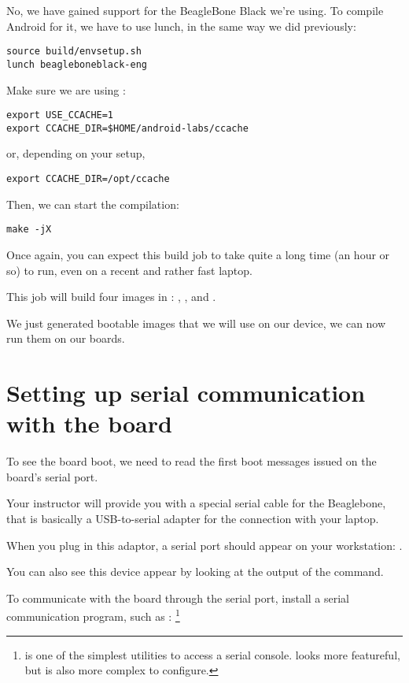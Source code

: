 No, we have gained support for the BeagleBone Black we're using. To
compile Android for it, we have to use lunch, in the same way we did
previously:

\begin{verbatim}
source build/envsetup.sh
lunch beagleboneblack-eng
\end{verbatim}

Make sure we are using :

\begin{verbatim}
export USE_CCACHE=1
export CCACHE_DIR=$HOME/android-labs/ccache
\end{verbatim}
or, depending on your setup,
\begin{verbatim}
export CCACHE_DIR=/opt/ccache
\end{verbatim}

Then, we can start the compilation:

\begin{verbatim}
make -jX
\end{verbatim}

Once again, you can expect this build job to take quite a long time
(an hour or so) to run, even on a recent and rather fast laptop.

This job will build four images in
: ,
 ,  and
.

We just generated bootable images that we will use on our device, we
can now run them on our boards.

\section{Setting up serial communication with the board}

To see the board boot, we need to read the first boot messages issued
on the board's serial port.

Your instructor will provide you with a special serial cable for the
Beaglebone, that is basically a USB-to-serial adapter for the
connection with your laptop.

When you plug in this adaptor, a serial port should appear on your
workstation: .

You can also see this device appear by looking at the output of the
 command.

To communicate with the board through the serial port, install a
serial communication program, such as :
\footnote{ is one of the simplest utilities to access a
  serial console.  looks more featureful, but is also
  more complex to configure.}

